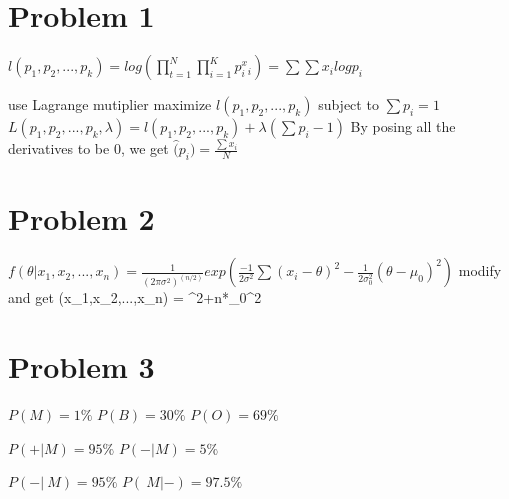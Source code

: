 \documentclass[11pt]{article}%
\begin{document}





\section{Problem 1}

$l(p_1, p_2, ..., p_k) = log( \prod_{t=1}^N \prod_{i=1}^K p_i^x_i ) = \sum \sum x_i log p_i $\newline

use Lagrange mutiplier \newline
	maximize $l(p_1, p_2, ..., p_k)$ \newline
	subject to $\sum p_i =1 $ \newline
$L(p_1, p_2, ..., p_k , \lambda) = l(p_1, p_2, ...,p_k ) + \lambda (\sum p_i -1 ) $\newline
By posing all the derivatives to be 0, we get \newline
	$\hat(p_i) = \frac{\sum x_i}{N} $ \newline


\section{Problem 2}

$f(\theta |x_1,x_2,...,x_n) = \frac{1}{(2\pi \sigma^2 )^(n/2)}
exp 
( 
	\frac{-1}{2\sigma^2} \sum(x_i-\theta)^2 
	-\frac{1}{2\sigma_0^2}(\theta-\mu_0)^2 
)

$
modify and get
\theta(x_1,x_2,...,x_n) =  {\sigma^2+n*\sigma_0^2}
\section{Problem 3}

$P(M) =1\%$ 	\newline
$P(B) =30\% $	\newline
$P(O) = 69\% $

$P(+| M) =95\% $	 \newline
$P(-|M) =5 \% $		 \newline


$P(-|~M)=95\% $ 	\newline
$P(~M| -) =97.5\% $	 \newline
\end{document}
